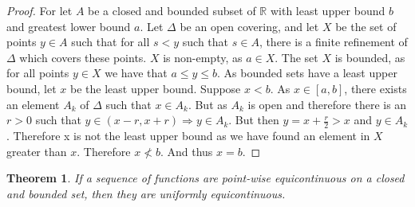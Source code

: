 \documentclass[crop=false,class=book]{standalone}
\theoremstyle{mystyle}
\newtheorem{theorem}{Theorem}[section]
\begin{document}
\begin{proof}
For let $A$ be a closed and bounded subset of $\mathbb{R}$ with least upper bound $b$ and greatest lower bound $a$. Let $\Delta$ be an open covering, and let $X$ be the set of points $y\in A$ such that for all $s<y$ such that $s\in A$, there is a finite refinement of $\Delta$ which covers these points. $X$ is non-empty, as $a\in X$. The set $X$ is bounded, as for all points $y\in X$ we have that $a\leq y \leq b$. As bounded sets have a least upper bound, let $x$ be the least upper bound. Suppose $x<b$. As $x\in [a,b]$, there exists an element $A_k$ of $\Delta$ such that $x \in A_k$. But as $A_k$ is open and therefore there is an $r>0$ such that $y\in (x-r,x+r)\Rightarrow y \in A_k$. But then $y=x + \frac{r}{2} > x$ and $y\in A_k$. Therefore x is not the least upper bound as we have found an element in $X$ greater than $x$. Therefore $x\not<b$. And thus $x=b$.
\end{proof}
\begin{theorem}
If a sequence of functions are point-wise equicontinuous on a closed and bounded set, then they are uniformly equicontinuous.
\end{theorem}
\end{document}
